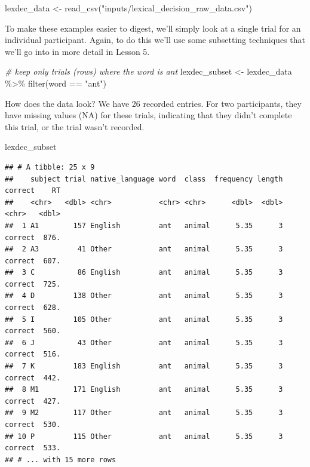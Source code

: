 \documentclass[
]{book}
\newenvironment{Shaded}{\begin{snugshade}}{\end{snugshade}}
\newcommand{\CommentTok}[1]{\textcolor[rgb]{0.56,0.35,0.01}{\textit{#1}}}
\newcommand{\FunctionTok}[1]{\textcolor[rgb]{0.00,0.00,0.00}{#1}}
\newcommand{\NormalTok}[1]{#1}
\newcommand{\OtherTok}[1]{\textcolor[rgb]{0.56,0.35,0.01}{#1}}
\newcommand{\SpecialCharTok}[1]{\textcolor[rgb]{0.00,0.00,0.00}{#1}}
\newcommand{\StringTok}[1]{\textcolor[rgb]{0.31,0.60,0.02}{#1}}
\begin{document}
\begin{Shaded}
\begin{Highlighting}[]
\NormalTok{lexdec\_data }\OtherTok{\textless{}{-}} \FunctionTok{read\_csv}\NormalTok{(}\StringTok{"inputs/lexical\_decision\_raw\_data.csv"}\NormalTok{)}
\end{Highlighting}
\end{Shaded}

To make these examples easier to digest, we'll simply look at a single trial for an individual participant. Again, to do this we'll use some subsetting techniques that we'll go into in more detail in Lesson 5.

\begin{Shaded}
\begin{Highlighting}[]
\CommentTok{\# keep only trials (rows) where the word is ant}
\NormalTok{lexdec\_subset }\OtherTok{\textless{}{-}}\NormalTok{ lexdec\_data }\SpecialCharTok{\%\textgreater{}\%} \FunctionTok{filter}\NormalTok{(word }\SpecialCharTok{==} \StringTok{"ant"}\NormalTok{)}
\end{Highlighting}
\end{Shaded}

How does the data look? We have 26 recorded entries. For two participants, they have missing values (NA) for these trials, indicating that they didn't complete this trial, or the trial wasn't recorded.

\begin{Shaded}
\begin{Highlighting}[]
\NormalTok{lexdec\_subset}
\end{Highlighting}
\end{Shaded}

\begin{verbatim}
## # A tibble: 25 x 9
##    subject trial native_language word  class  frequency length correct    RT
##    <chr>   <dbl> <chr>           <chr> <chr>      <dbl>  <dbl> <chr>   <dbl>
##  1 A1        157 English         ant   animal      5.35      3 correct  876.
##  2 A3         41 Other           ant   animal      5.35      3 correct  607.
##  3 C          86 English         ant   animal      5.35      3 correct  725.
##  4 D         138 Other           ant   animal      5.35      3 correct  628.
##  5 I         105 Other           ant   animal      5.35      3 correct  560.
##  6 J          43 Other           ant   animal      5.35      3 correct  516.
##  7 K         183 English         ant   animal      5.35      3 correct  442.
##  8 M1        171 English         ant   animal      5.35      3 correct  427.
##  9 M2        117 Other           ant   animal      5.35      3 correct  530.
## 10 P         115 Other           ant   animal      5.35      3 correct  533.
## # ... with 15 more rows
\end{verbatim}
\end{document}
